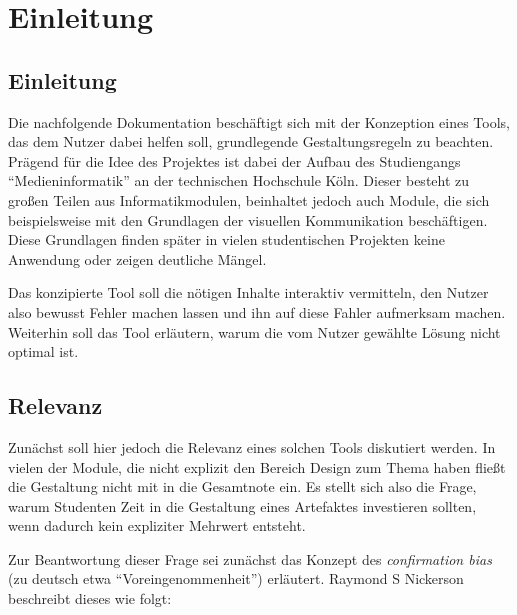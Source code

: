 
\newcommand{\chaptertitle}{Einleitung}

\chapter{\chaptertitle} %

\label{Einleitung} %

\lhead{\chaptername{} \thechapter{} - \emph{\chaptertitle}} %


\section{Einleitung}
Die nachfolgende Dokumentation beschäftigt sich mit der Konzeption eines Tools, das dem Nutzer dabei helfen soll, grundlegende Gestaltungsregeln zu beachten.
Prägend für die Idee des Projektes ist dabei der Aufbau des Studiengangs “Medieninformatik” an der technischen Hochschule Köln. Dieser besteht zu großen Teilen aus Informatikmodulen, beinhaltet jedoch auch Module, die sich beispielsweise mit den Grundlagen der visuellen Kommunikation beschäftigen. Diese Grundlagen finden später in vielen studentischen Projekten keine Anwendung oder zeigen deutliche Mängel.

Das konzipierte Tool soll die nötigen Inhalte interaktiv vermitteln, den Nutzer also bewusst Fehler machen lassen und ihn auf diese Fahler aufmerksam machen. Weiterhin soll das Tool erläutern, warum die vom Nutzer gewählte Lösung nicht optimal ist.



\section{Relevanz}
Zunächst soll hier jedoch die Relevanz eines solchen Tools diskutiert werden. In vielen der Module, die nicht explizit den Bereich Design zum Thema haben fließt die Gestaltung nicht mit in die Gesamtnote ein. Es stellt sich also die Frage, warum Studenten Zeit in die Gestaltung eines Artefaktes investieren sollten, wenn dadurch kein expliziter Mehrwert entsteht.

Zur Beantwortung dieser Frage sei zunächst das Konzept des \textit{confirmation bias} (zu deutsch etwa “Voreingenommenheit”) erläutert. Raymond S Nickerson beschreibt dieses wie folgt:

